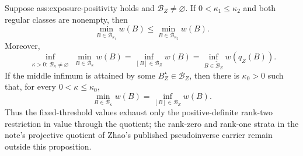 Suppose ass:exposure-positivity holds and \(\mathcal B_Z\ne\varnothing\).  If \(0<\kappa_1\le\kappa_2\) and both regular classes are nonempty, then
\[
\min_{B\in\mathcal B_{\kappa_1}}w(B)
\le
\min_{B\in\mathcal B_{\kappa_2}}w(B).
\]
Moreover,
\[
\inf_{\substack{\kappa>0:\,\mathcal B_\kappa\ne\varnothing}}
\min_{B\in\mathcal B_\kappa}w(B)
=
\inf_{[B]\in\mathcal B_Z}w(B)
=
\inf_{B\in\widetilde{\mathcal B}_Z}w(q_Z(B)).
\]
If the middle infimum is attained by some \(B_Z^\star\in\mathcal B_Z\), then there is \(\kappa_0>0\) such that, for every \(0<\kappa\le\kappa_0\),
\[
\min_{B\in\mathcal B_\kappa}w(B)=\inf_{[B]\in\mathcal B_Z}w(B).
\]
Thus the fixed-threshold values exhaust only the positive-definite rank-two restriction in value through the quotient; the rank-zero and rank-one strata in the note's projective quotient of Zhao's published pseudoinverse carrier remain outside this proposition.